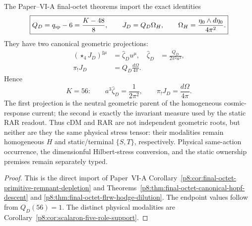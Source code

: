 \documentclass[12pt,a4paper]{article}
\begin{document}
\begin{theorem}
\label{p9:thm:final-octet-dual-dark-response-parent}
The Paper--VI-A final-octet theorems import the exact identities
\begin{equation}
 \label{p9:eq:imported-final-octet-common-parent}
 \boxed{
 Q_D=q_{\rm sp}-6=\frac{K-48}{8},
 \qquad
 J_D=Q_D\Omega_H,
 \qquad
 \Omega_H=\frac{\eta_0\wedge d\eta_0}{4\pi^2}.}
\end{equation}
They have two canonical geometric projections:
\begin{align}
 \label{p9:eq:imported-final-octet-hodge-projection}
 \boxed{(\star_4J_D)^{\sharp\mu}}
 &=\boxed{\widehat\zeta_Du^\mu},
 &\widehat\zeta_D&=\frac{Q_D}{2\pi^2a^3},\\
 \label{p9:eq:imported-final-octet-hopf-projection}
 \boxed{\pi_!J_D}
 &=\boxed{Q_D\frac{d\Omega}{4\pi}}.
\end{align}
Hence
\begin{equation}
 \label{p9:eq:imported-terminal-dual-parent}
 \boxed{
 K=56:\qquad
 a^3\widehat\zeta_D=\frac1{2\pi^2},
 \qquad
 \pi_!J_D=\frac{d\Omega}{4\pi}.}
\end{equation}
The first projection is the neutral geometric parent of the homogeneous
cosmic-response current; the second is exactly the invariant measure used by
the static RAR readout.  Thus cDM and RAR are not independent geometric roots,
but neither are they the same physical stress tensor: their modalities remain
homogeneous \(H\) and static/terminal \(\{S,T\}\), respectively.  Physical
same-action occurrence, the dimensionful Hilbert-stress conversion, and the
static ownership premises remain separately typed.
\end{theorem}

\begin{proof}
This is the direct import of Paper~VI-A
Corollary~\ref{p8:cor:final-octet-primitive-remnant-depletion} and
Theorems~\ref{p8:thm:final-octet-canonical-hopf-descent} and
\ref{p8:thm:final-octet-flrw-hodge-dilution}.  The endpoint values follow from
\(Q_D(56)=1\).  The distinct physical modalities are
Corollary~\ref{p8:cor:scalaron-five-role-support}.
\end{proof}
\end{document}
